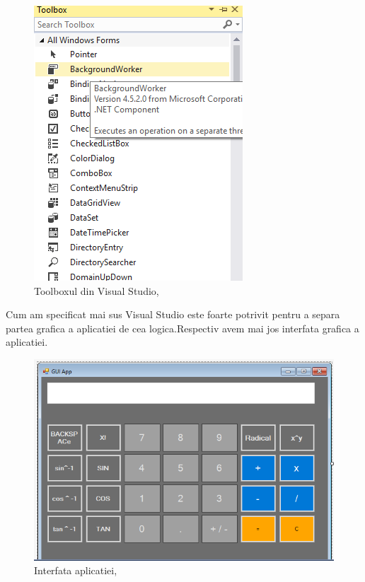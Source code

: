 \begin{figure}[!ht]
                     \centering
                     \includegraphics[scale = 0.6]{toolbox}
                     \caption{Toolboxul din Visual Studio, \cite{ImRef}}
                     \label{Im_label}
                \end{figure}


Cum am specificat mai sus Visual Studio este foarte potrivit pentru a separa partea grafica
a aplicatiei de cea logica.Respectiv avem mai jos interfata grafica a aplicatiei.

\begin{figure}[!ht]
                     \centering
                     \includegraphics[scale = 0.6]{interface}
                     \caption{Interfata aplicatiei, \cite{ImRef}}
                     \label{Im_label}
                \end{figure}

